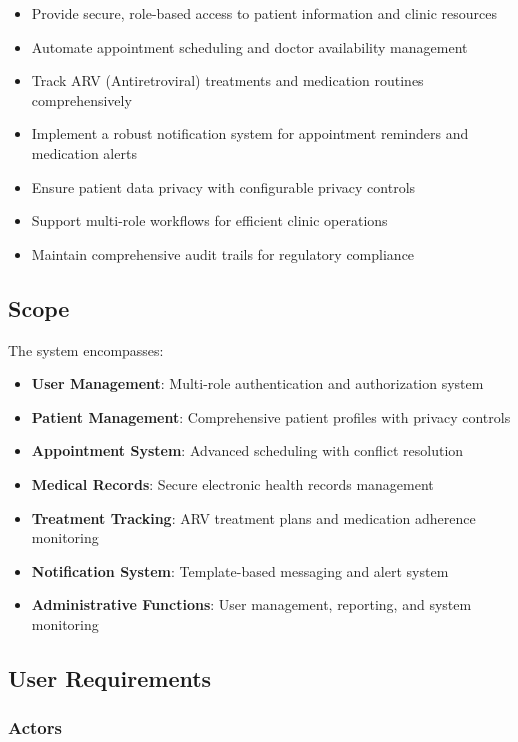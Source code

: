 \documentclass[12pt,a4paper]{article}
\begin{document}
\begin{itemize}
    \item Provide secure, role-based access to patient information and clinic resources
    \item Automate appointment scheduling and doctor availability management
    \item Track ARV (Antiretroviral) treatments and medication routines comprehensively
    \item Implement a robust notification system for appointment reminders and medication alerts
    \item Ensure patient data privacy with configurable privacy controls
    \item Support multi-role workflows for efficient clinic operations
    \item Maintain comprehensive audit trails for regulatory compliance
\end{itemize}

\subsection{Scope}

The system encompasses:
\begin{itemize}
    \item \textbf{User Management}: Multi-role authentication and authorization system
    \item \textbf{Patient Management}: Comprehensive patient profiles with privacy controls
    \item \textbf{Appointment System}: Advanced scheduling with conflict resolution
    \item \textbf{Medical Records}: Secure electronic health records management
    \item \textbf{Treatment Tracking}: ARV treatment plans and medication adherence monitoring
    \item \textbf{Notification System}: Template-based messaging and alert system
    \item \textbf{Administrative Functions}: User management, reporting, and system monitoring
\end{itemize}

\subsection{User Requirements}

\subsubsection{Actors}
\end{document}
